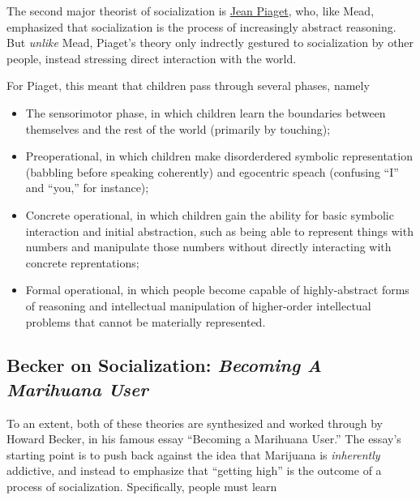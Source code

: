 \documentclass[
  letterpaper,
  DIV=11,
  numbers=noendperiod,
  oneside]{scrartcl}
\providecommand{\tightlist}{%
  \setlength{\itemsep}{0pt}\setlength{\parskip}{0pt}}
\begin{document}
The second major theorist of socialization is
\href{https://en.wikipedia.org/wiki/Jean_Piaget}{Jean Piaget}, who, like
Mead, emphasized that socialization is the process of increasingly
abstract reasoning. But \emph{unlike} Mead, Piaget's theory only
indrectly gestured to socialization by other people, instead stressing
direct interaction with the world.

For Piaget, this meant that children pass through several phases, namely

\begin{itemize}
\tightlist
\item
  The sensorimotor phase, in which children learn the boundaries between
  themselves and the rest of the world (primarily by touching);
\item
  Preoperational, in which children make disorderdered symbolic
  representation (babbling before speaking coherently) and egocentric
  speach (confusing ``I'' and ``you,'' for instance);
\item
  Concrete operational, in which children gain the ability for basic
  symbolic interaction and initial abstraction, such as being able to
  represent things with numbers and manipulate those numbers without
  directly interacting with concrete reprentations;
\item
  Formal operational, in which people become capable of highly-abstract
  forms of reasoning and intellectual manipulation of higher-order
  intellectual problems that cannot be materially represented.
\end{itemize}

\subsection{\texorpdfstring{Becker on Socialization: \emph{Becoming A
Marihuana
User}}{Becker on Socialization: Becoming A Marihuana User}}\label{becker-on-socialization-becoming-a-marihuana-user}

To an extent, both of these theories are synthesized and worked through
by Howard Becker, in his famous essay ``Becoming a Marihuana User.'' The
essay's starting point is to push back against the idea that Marijuana
is \emph{inherently} addictive, and instead to emphasize that ``getting
high'' is the outcome of a process of socialization. Specifically,
people must learn
\end{document}
